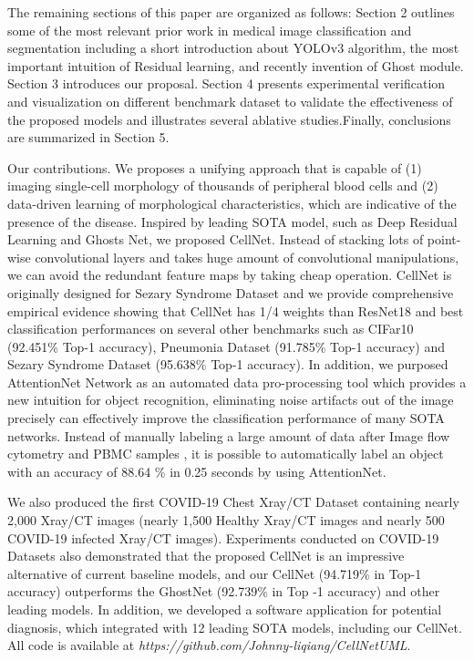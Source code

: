 The remaining sections of this paper are organized as follows: Section 2 outlines some of the most relevant  prior work in medical image classification and segmentation including a short introduction about YOLOv3 \cite{33} algorithm, the most important intuition of Residual learning, and recently invention of Ghost module.
Section 3 introduces our proposal. Section 4 presents experimental verification  and visualization on different benchmark dataset to validate the effectiveness of the proposed models and illustrates several ablative studies.Finally, conclusions are summarized in Section 5.

Our contributions. We proposes a unifying approach that is capable of (1) imaging single-cell morphology of thousands of peripheral blood cells and (2) data-driven learning of morphological characteristics, which are indicative of the presence of the disease.
Inspired by leading SOTA model, such as Deep Residual Learning\cite{20} and Ghosts Net\cite{19}, we proposed CellNet. Instead of stacking lots of point-wise convolutional layers and takes huge amount of convolutional manipulations, we can avoid the redundant feature maps by taking cheap operation. CellNet is originally designed for Sezary Syndrome Dataset and we provide comprehensive empirical evidence showing that CellNet has 1/4 weights than ResNet18 \cite{20} and best classification performances on 
several other benchmarks such as CIFar10 \cite{21} (92.451\% Top-1 accuracy), Pneumonia Dataset\cite{38} (91.785\% Top-1 accuracy) and Sezary Syndrome Dataset (95.638\% Top-1 accuracy).
In addition, we purposed AttentionNet Network as an automated data pro-processing tool which provides a new intuition for object recognition, eliminating noise artifacts out of the image precisely can effectively improve the classification performance of many SOTA networks. Instead of manually labeling a large amount of data after Image flow cytometry and PBMC samples \cite{12}, it is possible to automatically label an object with an accuracy of 88.64 \% in 0.25 seconds by using AttentionNet. 

We also produced the first COVID-19 Chest Xray/CT Dataset containing nearly 2,000 Xray/CT images (nearly 1,500 Healthy Xray/CT images and nearly 500 COVID-19 infected Xray/CT images). Experiments conducted on COVID-19 Datasets also demonstrated that the proposed CellNet is an impressive alternative of current baseline models, and our CellNet (94.719\% in Top-1 accuracy) outperforms the GhostNet\cite{19} (92.739\%  in Top -1 accuracy) and other leading models. In addition, we developed a software application for potential diagnosis, which integrated with 12 leading SOTA models, including our CellNet. All code is available at \textit{https://github.com/Johnny-liqiang/CellNetUML}.



